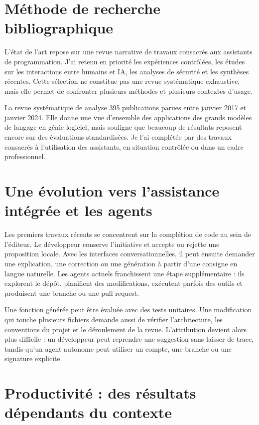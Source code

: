 \documentclass[12pt,a4paper,oneside]{report}
\begin{document}
\section{Méthode de recherche bibliographique}

L'état de l'art repose sur une revue narrative de travaux consacrés aux assistants de programmation. J'ai retenu en priorité les expériences contrôlées, les études sur les interactions entre humains et IA, les analyses de sécurité et les synthèses récentes. Cette sélection ne constitue pas une revue systématique exhaustive, mais elle permet de confronter plusieurs méthodes et plusieurs contextes d'usage.

La revue systématique de \textcite{hou2024slr} analyse 395 publications parues entre janvier 2017 et janvier 2024. Elle donne une vue d'ensemble des applications des grands modèles de langage en génie logiciel, mais souligne que beaucoup de résultats reposent encore sur des évaluations standardisées. Je l'ai complétée par des travaux consacrés à l'utilisation des assistants, en situation contrôlée ou dans un cadre professionnel.

\section{Une évolution vers l'assistance intégrée et les agents}

Les premiers travaux récents se concentrent sur la complétion de code au sein de l'éditeur. Le développeur conserve l'initiative et accepte ou rejette une proposition locale. Avec les interfaces conversationnelles, il peut ensuite demander une explication, une correction ou une génération à partir d'une consigne en langue naturelle. Les agents actuels franchissent une étape supplémentaire : ils explorent le dépôt, planifient des modifications, exécutent parfois des outils et produisent une branche ou une pull request.

Une fonction générée peut être évaluée avec des tests unitaires. Une modification qui touche plusieurs fichiers demande aussi de vérifier l'architecture, les conventions du projet et le déroulement de la revue. L'attribution devient alors plus difficile : un développeur peut reprendre une suggestion sans laisser de trace, tandis qu'un agent autonome peut utiliser un compte, une branche ou une signature explicite.

\section{Productivité : des résultats dépendants du contexte}
\end{document}

